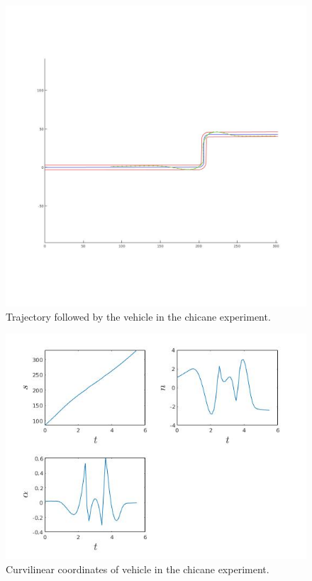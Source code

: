 \documentclass[conference,11pt]{IEEEtran}
\begin{document}
\begin{figure}[t]
  \centering
  \includegraphics[scale=0.25]{chicane.jpg}
  \caption{Trajectory followed by the vehicle in the chicane experiment.}
  \label{fig:cg}
\end{figure}
\begin{figure}[b]
  \centering
  \includegraphics[scale=0.5]{chicane_curv.jpg}
  \caption{Curvilinear coordinates of vehicle in the chicane experiment.}
  \label{fig:cg}
\end{figure}
\end{document}
